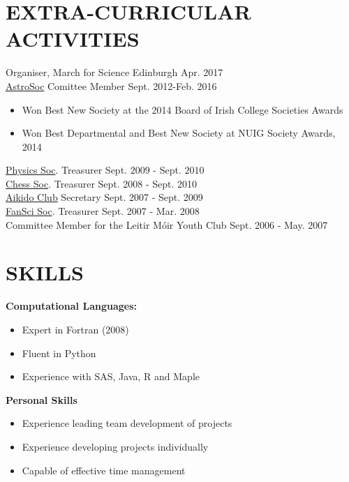 \documentclass[margin, 10pt]{res} %
\begin{document}
\begin{resume}

\section{EXTRA-CURRICULAR \\ ACTIVITIES} 
Organiser, March for Science Edinburgh \hfill Apr. 2017 \\
\href{http://www.socs.nuigalway.ie/society_profiles/view/447}{AstroSoc} Comittee Member \hfill Sept. 2012-Feb. 2016
\begin{itemize}\itemsep -2pt
 \item Won Best New Society at the 2014 Board of Irish College Societies Awards
 \item Won Best Departmental and Best New Society at NUIG Society Awards, 2014
\end{itemize}
\href{http://www.socs.nuigalway.ie/society_profiles/view/73}{Physics Soc}. Treasurer \hfill Sept. $2009$ - Sept. $2010$ \\
\href{http://www.socs.nuigalway.ie/society_profiles/view/25}{Chess Soc}. Treasurer \hfill Sept. 2008 - Sept. 2010\\
\href{http://www.clubs.nuigalway.ie/club/293/aikido}{Aikido Club} Secretary \hfill Sept. 2007 - Sept. 2009 \\
\href{http://www.socs.nuigalway.ie/society_profiles/view/42}{FanSci Soc}. Treasurer \hfill Sept. 2007 - Mar. 2008 \\
Committee Member for the Leitir M\'oir Youth Club \hfill Sept. 2006 - May. 2007

\section{SKILLS} 
{\bf Computational Languages:} 
\begin{itemize} \itemsep -2pt
 \item Expert in Fortran (2008)
 \item Fluent in Python
 \item Experience with SAS, Java, R and Maple
\end{itemize}

{\bf Personal Skills}
\begin{itemize} \itemsep -2pt
 \item Experience leading team development of projects
 \item Experience developing projects individually
 \item Capable of effective time management
\end{itemize}


\end{resume}
\end{document}
